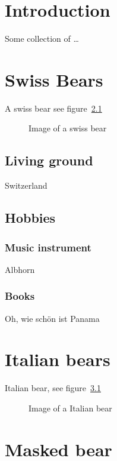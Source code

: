 \tableofcontents

\listoffigures

\newpage

\chapter{Introduction}

Some collection of \ldots 


\chapter{Swiss Bears}

A swiss bear see figure~\ref{fig:swissbear}

\begin{figure}
\caption{Image of a swiss bear\label{fig:swissbear}}
\end{figure}

\section{Living ground}

Switzerland

\section{Hobbies}

\subsection{Music instrument}
Albhorn

\subsection{Books}
Oh, wie schön ist Panama


\chapter{Italian bears}

Italian bear, see figure~\ref{fig:italianbear}

\begin{figure}
\caption{Image of a Italian bear\label{fig:italianbear}}
\end{figure}

\chapter{Masked bear}

